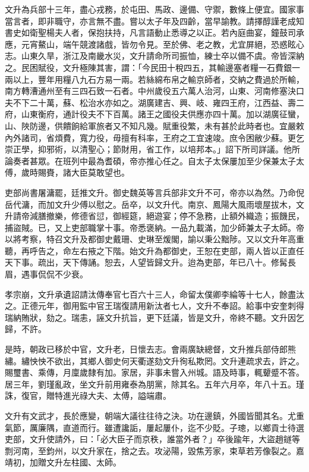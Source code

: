 \begin{pinyinscope}
文升為兵部十三年，盡心戎務，於屯田、馬政、邊備、守禦，數條上便宜。國家事當言者，即非職守，亦言無不盡。嘗以太子年及四齡，當早諭教。請擇醇謹老成知書史如衛聖楊夫人者，保抱扶持，凡言語動止悉導之以正。若內庭曲宴，鐘鼓司承應，元宵鰲山，端午競渡諸戲，皆勿令見。至於佛、老之教，尤宜屏絕，恐惑眩心志。山東久旱，浙江及南畿水災，文升請命所司振恤，練士卒以備不虞。帝皆深納之。民困賦役，文升極陳其害，謂：「今民田十稅四五，其輸邊塞者糧一石費銀一兩以上，豐年用糧八九石方易一兩。若絲綿布帛之輸京師者，交納之費過於所輸，南方轉漕通州至有三四石致一石者。中州歲役五六萬人治河，山東、河南修塞決口夫不下二十萬，蘇、松治水亦如之。湖廣建吉、興、岐、雍四王府，江西益、壽二府，山東衡府，通計役夫不下百萬。諸王之國役夫供應亦四十萬。加以湖廣征蠻，山、陜防邊，供饋餉給軍旅者又不知凡幾。賦重役繁，未有甚於此時者也。宜嚴敕內外諸司，省煩費，寬力役，毋擅有科率，王府之工宜速竣。庶令困敝少蘇。更乞崇正學，抑邪術，以清聖心；節財用，省工作，以培邦本。」詔下所司詳議。他所論奏者甚眾。在班列中最為耆碩，帝亦推心任之。自太子太保屢加至少保兼太子太傅，歲時賜賚，諸大臣莫敢望也。

吏部尚書屠滽罷，廷推文升。御史魏英等言兵部非文升不可，帝亦以為然。乃命倪岳代滽，而加文升少傅以慰之。岳卒，以文升代。南京、鳳陽大風雨壞屋拔木，文升請帝減膳撤樂，修德省愆，御經筵，絕遊宴；停不急務，止額外織造；振饑民，捕盜賊。已，又上吏部職掌十事。帝悉褒納。一品九載滿，加少師兼太子太師。帝以將考察，特召文升及都御史戴珊、史琳至煖閣，諭以秉公黜陟。又以文升年高重聽，再呼告之，命左右掖之下階。始文升為都御史，王恕在吏部，兩人皆以正直任天下事。疏出，天下傳誦。恕去，人望皆歸文升。迨為吏部，年已八十。修髯長眉，遇事侃侃不少衰。

孝宗崩，文升承遺詔請汰傳奉官七百六十三人，命留太僕卿李綸等十七人，餘盡汰之。正德元年，御用監中官王瑞復請用新汰者七人，文升不奉詔。給事中安奎刺得瑞納賄狀，劾之。瑞恚，誣文升抗旨，更下廷議，皆是文升，帝終不聽。文升因乞歸，不許。

是時，朝政已移於中官，文升老，日懷去志。會兩廣缺總督，文升推兵部侍郎熊繡。繡怏怏不欲出，其鄉人御史何天衢遂劾文升徇私欺罔。文升連疏求去，許之。賜璽書、乘傳，月廩歲隸有加。家居，非事未嘗入州城。語及時事，輒顰蹙不答。居三年，劉瑾亂政，坐文升前用雍泰為朋黨，除其名。五年六月卒，年八十五。瑾誅，復官，贈特進光祿大夫、太傅，謚端肅。

文升有文武才，長於應變，朝端大議往往待之決。功在邊鎮，外國皆聞其名。尤重氣節，厲廉隅，直道而行。雖遭讒詬，屢起屢仆，迄不少貶。子璁，以鄉貢士待選吏部，文升使請外，曰：「必大臣子而京秩，誰當外者？」卒後踰年，大盜趙鐩等剽河南，至鈞州，以文升家在，捨之去。攻泌陽，毀焦芳家，束草若芳像裂之。嘉靖初，加贈文升左柱國、太師。


\end{pinyinscope}
